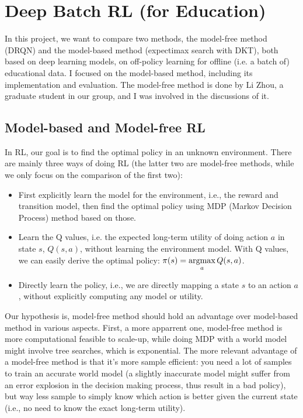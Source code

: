 \section{Deep Batch RL (for Education)}
\label{deepRL}

In this project, we want to compare two methods, the model-free method (DRQN) and the model-based method (expectimax search with DKT), both based on deep learning models, on off-policy learning for offline (i.e. a batch of) educational data. I focused on the model-based method, including its implementation and evaluation. The model-free method is done by Li Zhou, a graduate student in our group, and I was involved in the discussions of it.

\subsection{Model-based and Model-free RL}
\label{subsec:model-free}

In RL, our goal is to find the optimal policy in an unknown environment. There are mainly three ways of doing RL (the latter two are model-free methods, while we only focus on the comparison of the first two):

\begin{itemize}
\item First explicitly learn the model for the environment, i.e., the reward and transition model, then find the optimal policy using MDP (Markov Decision Process) method based on those.
\item Learn the Q values, i.e. the expected long-term utility of doing action $a$ in state $s$, $Q(s, a)$, without learning the environment model. With Q values, we can easily derive the optimal policy: $\pi(s)=\argmax\limits_a Q(s, a)$.
\item Directly learn the policy, i.e., we are directly mapping a state $s$ to an action $a$, without explicitly computing any model or utility. 
\end{itemize}

Our hypothesis is, model-free method should hold an advantage over model-based method in various aspects. First, a more apparrent one, model-free method is more computational feasible to scale-up, while doing MDP with a world model might involve tree searches, which is exponential. The more relevant advantage of a model-free method is that it's more sample efficient: you need a lot of samples to train an accurate world model (a slightly inaccurate model might suffer from an error explosion in the decision making process, thus result in a bad policy), but way less sample to simply know which action is better given the current state (i.e., no need to know the exact long-term utility).

